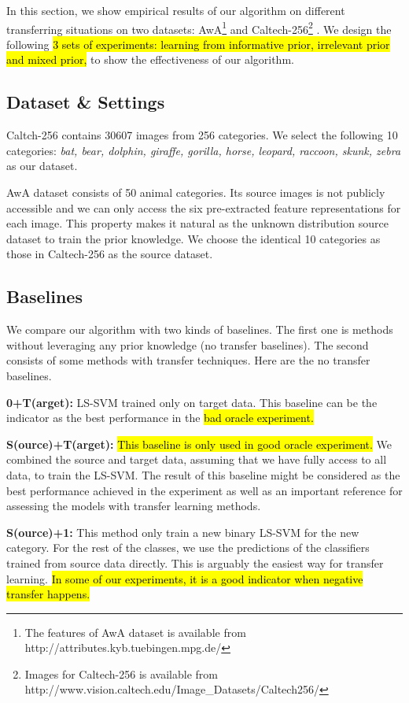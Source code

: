 In this section, we show empirical results of our algorithm on different transferring situations on two datasets: AwA\footnote{The features of AwA dataset is available from http://attributes.kyb.tuebingen.mpg.de/} \cite{lampert2009learning} and Caltech-256\footnote{Images for Caltech-256 is available from http://www.vision.caltech.edu/Image\_Datasets/Caltech256/} \cite{griffin2007caltech}. We design the following \hl{3 sets of experiments: learning from informative prior, irrelevant prior and mixed prior, } to show the effectiveness of our algorithm.
\subsection{Dataset \& Settings}
Caltch-256 contains 30607 images from 256 categories. We select the following 10 categories: \textit{bat, bear, dolphin, giraffe, gorilla, horse, leopard, raccoon, skunk, zebra} as our dataset.

AwA dataset consists of 50 animal categories. Its source images is not publicly accessible and we can only access the six pre-extracted feature representations for each image. This property makes it natural as the unknown distribution source dataset to train the prior knowledge. We choose the identical 10 categories as those in Caltech-256 as the source dataset.

\subsection{Baselines}
We compare our algorithm with two kinds of baselines. The first one is methods without leveraging any prior knowledge (no transfer baselines). The second consists of some methods with transfer techniques. Here are the no transfer baselines. 

\textbf{0+T(arget):} LS-SVM trained only on target data. This baseline can be the indicator as the best performance in the \hl{bad oracle experiment.}

\textbf{S(ource)+T(arget):} \hl{This baseline is only used in good oracle experiment.} We combined the source and target data, assuming that we have fully access to all data, to train the LS-SVM. The result of this baseline might be considered as the best performance achieved in the experiment as well as an important reference for assessing the models with transfer learning methods.

\textbf{S(ource)+1:} This method only train a new binary LS-SVM for the new category. For the rest of the classes, we use the predictions of the classifiers trained from source data directly. This is arguably the easiest way for transfer learning. \hl{In some of our experiments, it is a good indicator when negative transfer happens.} 

